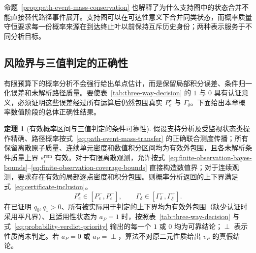 \documentclass[master,fontset=ubuntu]{shnuthesis}
\DeclareRobustCommand{\probstatus}[1]{\ensuremath{#1}}
\theoremstyle{definition}
\newtheorem{thesistheorem}{定理}
\begin{document}
命题~\ref{prop:path-event-mass-conservation} 也解释了为什么支持图中的状态合并不能直接替代路径事件展开。支持图可以在可达性意义下合并同类状态，而概率质量守恒要求每一份概率来源在到达终止叶以前保持互斥历史身份；两种表示服务于不同分析目标。

\subsection{风险界与三值判定的正确性}

有限预算下的概率分析不会强行给出单点估计，而是保留局部积分误差、条件归一化误差和未解析路径质量。要使表~\ref{tab:three-way-decision} 的 \probstatus{1} 与 \probstatus{0} 具有认证意义，必须证明这些误差经过所有运算后仍然包围真实 \(P_e^\star\) 与 \(\Gamma_\delta\)。下面给出本章概率数值阶段的总体正确性结果。

\begin{thesistheorem}[有效概率区间与三值判定的条件可靠性]
\label{thm:probability-certificate-soundness}
假设支持分析及受监视状态类操作精确、路径概率按式~\eqref{eq:path-event-mass-transfer} 的正确联合测度传播；所有保留离散原子质量、连续单元密度和数值积分区间均为有效外包围，且各未解析条件质量上界 \(\varepsilon_i^{\mathrm{rem}}\) 有效。对于有限离散观测，允许按式~\eqref{eq:finite-observation-bayes-bounds}--\eqref{eq:finite-observation-coverage-bounds} 直接构造数值界；对于连续观测，要求存在有效的局部逐点密度和积分包围。则概率分析返回的上下界满足式~\eqref{eq:certificate-inclusion}。
\begin{equation}
P_e^\star\in[P_e^-,P_e^+],
\qquad
\Gamma_\delta\in
[\Gamma_\delta^-,\Gamma_\delta^+].
\label{eq:certificate-inclusion}
\end{equation}
在已证明 $q_0,q_1>0$、所有被实际用于判定的上下界均为有效外包围（缺少认证时采用平凡界）、且适用性状态为 $a_P=1$ 时，按照表~\ref{tab:three-way-decision} 与式~\eqref{eq:probability-verdict-priority} 输出的每一个 \probstatus{1} 或 \probstatus{0} 均为可靠结论；\probstatus{\perp} 表示性质尚未判定。若 \(a_P=0\) 或 \(a_P=\perp\)，算法不对原二元性质给出 \(v_P\) 的真假结论。
\end{thesistheorem}
\end{document}
